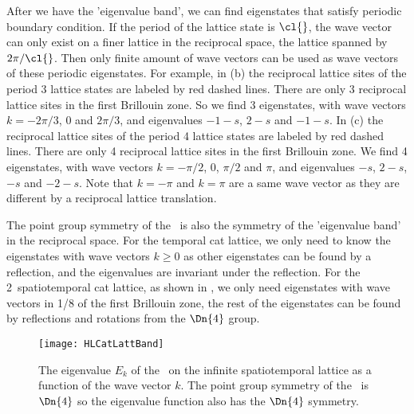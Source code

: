 \begin{description}
After we have the 'eigenvalue band', we can find eigenstates that satisfy periodic boundary
condition. If the period of the lattice state is $\cl{}$, the wave vector can only exist on a finer
lattice in the reciprocal space, the lattice spanned by $2\pi/\cl{}$. Then only finite amount
of wave vectors can be used as wave vectors of these periodic eigenstates. For example,
in  (b)
the reciprocal lattice sites of the period 3 lattice states
are labeled by red dashed lines. There are only 3 reciprocal lattice sites in the first Brillouin
zone. So we find 3 eigenstates, with wave vectors $k=-2\pi/3$, $0$ and $2\pi/3$, and
eigenvalues $-1-s$, $2-s$ and $-1-s$.
In  (c)
the reciprocal lattice sites of the period 4 lattice states
are labeled by red dashed lines. There are only 4 reciprocal lattice sites in the first Brillouin
zone. We find 4 eigenstates, with wave vectors $k=-\pi/2$, $0$, $\pi/2$ and $\pi$, and
eigenvalues $-s$, $2-s$, $-s$ and $-2-s$. Note that $k=-\pi$ and $k=\pi$ are a same wave
vector as they are different by a reciprocal lattice translation.

The point group symmetry of the \jacobianOrb\ is also the symmetry of the 'eigenvalue band'
in the reciprocal space. For the temporal cat lattice, we only need to know the eigenstates with
wave vectors $k\geq0$ as other eigenstates can be found by a reflection, and the eigenvalues
are invariant under the reflection. For the 2\dmn\ spatiotemporal cat lattice,
as shown in , we only need
eigenstates with wave vectors in 1/8 of the first Brillouin zone, the rest of the eigenstates can
be found by reflections and rotations from the $\Dn{4}$ group.

\begin{figure}\begin{center}
            \begin{minipage}[c]{0.45\textwidth}\begin{center}
\texttt{[image: HLCatLattBand]}\\
            \end{center}\end{minipage}
\end{center}
  \caption{\label{fig:HLCatLattBand}
The eigenvalue $E_{k}$ of the \jacobianOrb\ on the infinite spatiotemporal lattice
as a function of the wave vector $k$. The point group symmetry of the \jacobianOrb\
is $\Dn{4}$ so the eigenvalue function also has the $\Dn{4}$ symmetry.
}
\end{figure}


\end{description}
